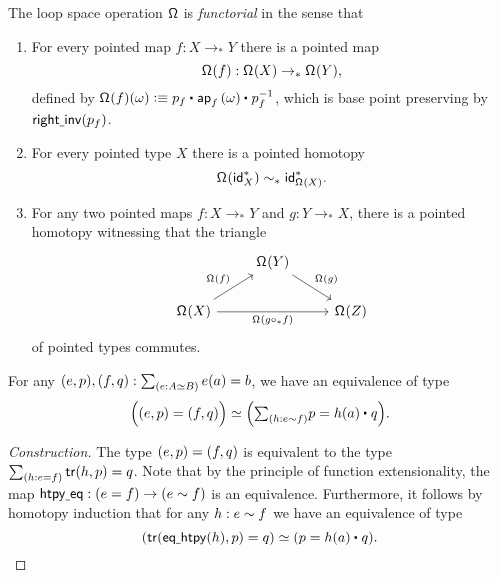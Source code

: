 \begin{defn}
The loop space operation $\mathsf{\Omega}$ is \emph{functorial} in the sense that
\begin{enumerate}
\item For every pointed map $f:X\to_\ast Y$ there is a pointed map
\begin{equation*}
\mathsf{\Omega}^{}(f):\mathsf{\Omega}^{}(X)\to_\ast \mathsf{\Omega}^{}(Y),
\end{equation*}
defined by $\loopspace{f}(\omega)\defeq \ct{p_f}{\ap{f}{\omega}}{p_f^{-1}}$, which is base point preserving by $\mathsf{right\underline{\ }{}inv}(p_f)$. 
\item For every pointed type $X$ there is a pointed homotopy
\begin{equation*}
\mathsf{\Omega}^{}(\mathsf{id}^\ast_X)\sim_\ast \mathsf{id}^\ast_{\mathsf{\Omega}^{}(X)}.
\end{equation*}
\item For any two pointed maps $f:X\to_\ast Y$ and $g:Y\to_\ast X$, there is a pointed homotopy witnessing that the triangle
\begin{equation*}
\begin{tikzcd}
& \loopspace{Y} \arrow[dr,"\loopspace{g}"] \\
\loopspace{X} \arrow[rr,swap,"\loopspace{g\circ_\ast f}"] \arrow[ur,"\loopspace{f}"] & & \loopspace{Z}
\end{tikzcd}
\end{equation*}
of pointed types commutes.
\end{enumerate}
\end{defn}

\begin{lem}\label{lem:equiv_of_ptdequiv}
For any $\pairr{e,p},\pairr{f,q}:\sm{e:\eqv{A}{B}}e(a)=b$, we have an equivalence of type
\begin{equation*}
\eqv{\Big(\pairr{e,p}=\pairr{f,q}\Big)}{\Big(\sm{h:e\htpy f} p=\ct{h(a)}{q}\Big)}.
\end{equation*}
\end{lem}

\begin{proof}[Construction]
The type ${\mathopen{}(e,p)\mathclose{}}={\mathopen{}(f,q)\mathclose{}}$ is equivalent
to the type $\sm{h:e=f}\tr({h},{p})=q$.
Note that by the principle of function extensionality,
the map $\mathsf{htpy\underline{\ }{}eq}:(e=f)\to(e\sim f)$
is an equivalence. Furthermore, it follows by homotopy induction that for any 
$h:e\sim f$ we have an equivalence of type
\begin{equation*}
\eqv{(\tr({\eqhtpy(h)},{p})=q)}
    {(p= \ct{h(a)}{q})}.\qedhere
\end{equation*}
\end{proof}

